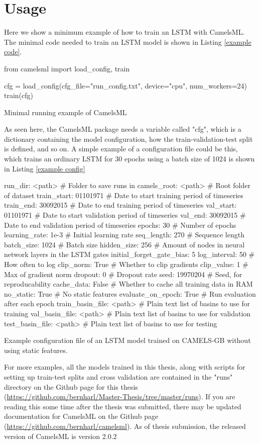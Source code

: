 \section{Usage}
Here we show a minimum example of how to train an LSTM with CamelsML. 
The minimal code needed to train an LSTM model is shown in Listing \ref{example code}. 
\begin{listing}
\begin{pythoncode}
from camelsml import load_config, train

cfg = load_config(cfg_file="run_config.txt", device="cpu", num_workers=24)
train(cfg)
\end{pythoncode}
    \caption[Minimal running example CamelsML.]{Minimal running example of CamelsML}
    \label{example code}
\end{listing}
As seen here, the CamelsML package needs a variable called "cfg", which is a dictionary 
containing the model configuration, how the train-validation-test split is defined, 
and so on. 
A simple example of a configuration file could be this, which trains an ordinary 
LSTM for 30 epochs using a batch size of 1024 is shown in Listing \ref{example config}
\begin{listing}
\begin{cfgcode}
run_dir: <path> # Folder to save runs in
camels_root: <path> # Root folder of dataset
train_start: 01101971 # Date to start training period of timeseries
train_end: 30092015 # Date to end training period of timeseries
val_start: 01101971 # Date to start validation period of timeseries
val_end: 30092015 # Date to end validation period of timeseries
epochs: 30 # Number of epochs
learning_rate: 1e-3 # Initial learning rate
seq_length: 270 # Sequence length
batch_size: 1024 # Batch size
hidden_size:  256 # Amount of nodes in neural network layers in the LSTM gates
initial_forget_gate_bias: 5 
log_interval: 50 # How often to log
clip_norm: True # Whether to clip gradients
clip_value: 1 # Max of gradient norm
dropout: 0 # Dropout rate
seed: 19970204 # Seed, for reproducability 
cache_data: False # Whether to cache all training data in RAM
no_static: True # No static features
evaluate_on_epoch: True # Run evaluation after each epoch
train_basin_file: <path> # Plain text list of basins to use for training 
val_basin_file:  <path> # Plain text list of basins to use for validation
test_basin_file: <path> # Plain text list of basins to use for testing
\end{cfgcode}
    \caption[Example configuration file CamelsML.]{Example configuration file of an LSTM model trained on CAMELS-GB without using static features.}
    \label{example config}
\end{listing}

For more examples, all the models trained in this thesis, along with scripts for 
setting up train-test splits and cross validation are contained in the "runs" directory on the 
Github page for this thesis (\url{https://github.com/bernharl/Master-Thesis/tree/master/runs}).
If you are reading this some time after the thesis was submitted, there may be updated 
documentation for CamelsML on the Github page (\url{https://github.com/bernharl/camelsml}).
As of thesis submission, the released version of CamelsML is version 2.0.2
